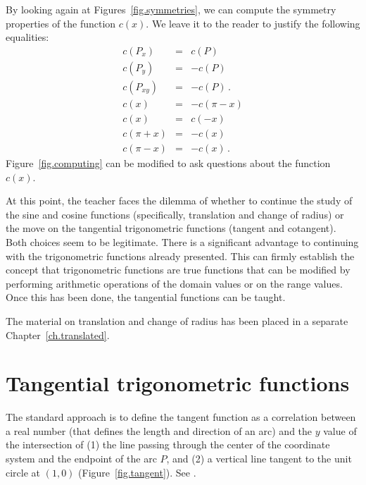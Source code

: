 By looking again at Figures~\ref{fig.symmetries}, we can compute the symmetry properties of the function $c(x)$. We leave it to the reader to justify the following equalities:
\begin{eqnarray*}
c(P_x) &=& c(P)\\
c(P_y) &=& -c(P)\\
c(P_{xy}) &=& -c(P)\,.
\\
c(x) &=& -c(\pi - x)\\
c(x) &=& c(-x)\\
c(\pi+x) &=& -c(x)\\
c(\pi-x) &=& -c(x)\,.
\end{eqnarray*}
Figure~\ref{fig.computing} can be modified to ask questions about the function $c(x)$.

At this point, the teacher faces the dilemma of whether to continue the study of the sine and cosine functions (specifically, translation and change of radius) or the move on the tangential trigonometric functions (tangent and cotangent).
Both choices seem to be legitimate.
There is a significant advantage to continuing with the trigonometric functions already presented. 
This can firmly establish the concept that trigonometric functions are true functions that can be modified by performing arithmetic operations of the domain values or on the range values.
Once this has been done, the tangential functions can be taught.

The material on translation and change of radius has been placed in a separate Chapter~\ref{ch.translated}.



\section{Tangential trigonometric functions}

The standard approach is to define the tangent function as a correlation between a real number (that defines the length and direction of an arc) and the $y$ value of the intersection of (1) the line passing through the center of the coordinate system and the endpoint of the arc $P$, and (2) a vertical line tangent to the unit circle at $(1,0)$ (Figure~\ref{fig.tangent}). See .


